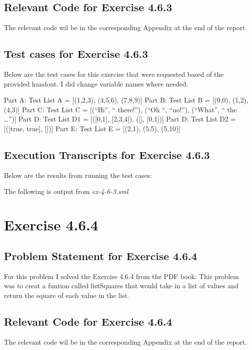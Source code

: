 \documentclass{report}
\begin{document}
\section{Relevant Code for Exercise 4.6.3}
\label{sec:relevant-code-ex-4-6-3}
  The relevant code wil be in the corresponding Appendix at the
  end of the report.

\section{Test cases for Exercise 4.6.3}
\label{sec:tests-ex-4-6-3}

Below are the test cases for this exercise that were requested based
of the provided handout. I did change variable names where needed.

Part A: Test List A = [(1,2,3), (4,5,6), (7,8,9)] 
Part B: Test List B = [(0,0), (1,2), (4,3)]
Part C: Test List C = [(“Hi”, “ there!”), (“Oh “, “no!”), (“What”, “ the …”)]
Part D: Test List D1 = [([0,1], [2,3,4]), ([], [0,1])]
Part D: Test List D2 = [([true, true], [])]
Part E: Test List E = [(2,1), (5,5), (5,10)]

\section{Execution Transcripts for Exercise 4.6.3}
\label{sec:exe-ex-4-6-3}

Below are the results from running the test cases:

The following is output from \emph{ex-4-6-3.sml}


\chapter{Exercise 4.6.4}
\label{cha:exercise-4-6-4}

\section{Problem Statement for Exercise 4.6.4}
\label{sec:problem-statement-ex-4-6-4}
For this problem I solved the Exercise 4.6.4 from the PDF book.  This
problem was to creat a funtion called listSquares that would take in a
list of values and return the square of each value in the list.

\section{Relevant Code for Exercise 4.6.4}
\label{sec:relevant-code-ex-4-6-4}
  The relevant code wil be in the corresponding Appendix at the
  end of the report.
\end{document}

